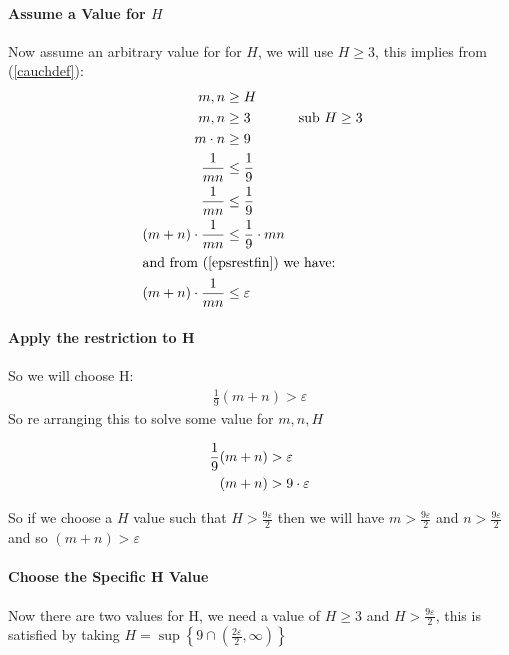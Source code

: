 \documentclass[class=article, crop=false]{standalone}
\begin{document}
\paragraph{Assume a Value for $H$}

Now assume an arbitrary value for for $H$, we will use $H \geq 3$, this implies from (\ref{cauchdef}):
\begin{align}
  m, n &\geq H \notag \\
  m, n &\geq 3 && \text{sub $H\geq3$} \notag \\
  m \cdot n &\geq 9  \notag \\
  \frac{1}{mn} &\leq \frac{1}{9} \notag \\
  \frac{1}{mn} &\leq \frac{1}{9} \notag \\
  \left( m+n \right)\cdot \frac{1}{mn} &\leq \frac{1}{9} \cdot mn \notag \\
  \intertext{and from (\ref{epsrestfin}) we have:} \notag
  \left( m+n \right)\cdot \frac{1}{mn} &\leq \varepsilon
\end{align}

\paragraph{Apply the restriction to H}
So we will choose H:
\begin{align}
  \frac{1}{9} (m+n) > \varepsilon
  \label{Hrest2}
\end{align}
So re arranging this to solve some value for $m,n, H$

\begin{align}
  \frac{1}{9} (m+n) &> \varepsilon \notag \\
  (m+n) &> 9\cdot \varepsilon \notag \\
\end{align}

So if we choose a $H$ value such that $H > \frac{9\varepsilon}{2}$ then we will have $m> \frac{9\varepsilon}{2}$ and $n > \frac{9\varepsilon}{2}$ and so $\left( m+n \right) > \varepsilon$

\paragraph{Choose the Specific H Value}
Now there are two values for H, we need a value of $H\geq3$ and $H > \frac{9\varepsilon}{2}$, this is satisfied by taking $H  = \sup \left\{ 9 \cap \left( \frac{2\varepsilon}{2}, \infty \right) \right\}$
\end{document}
